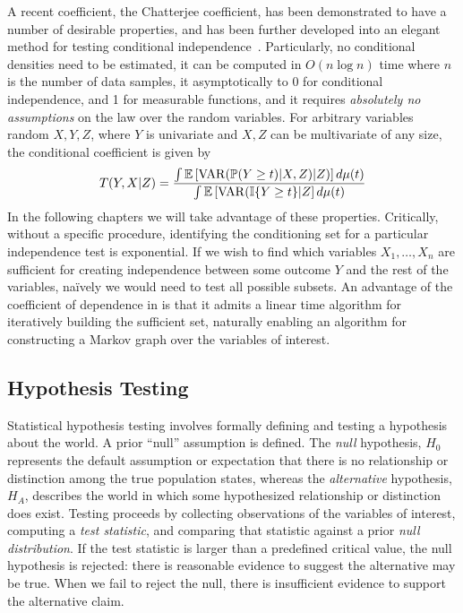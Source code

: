 A recent coefficient, the Chatterjee coefficient, has been demonstrated to have a number of desirable properties, and has been further developed into an elegant method for testing conditional independence~\citep{chatterjee2020new,codec}. 
Particularly,
no conditional densities need to be estimated,
it can be computed in $O(n\log n)$ time where $n$ is the number of data samples,
it asymptotically to 0 for conditional independence, and 1 for measurable functions,
and it requires \textit{absolutely no assumptions} on the law over the random variables.
For arbitrary variables random $X,Y,Z$, where $Y$ is univariate and $X,Z$ can be multivariate of any size, the conditional coefficient is given  by
\begin{align}\label{eq:contcodec}
    T(Y,X|Z) = \frac{\int\mathbb{E}\left[\operatorname*{VAR}(\mathbb{P}(Y\geq t)|X,Z)|Z)\right]d\mu(t)}{\int\mathbb{E}\left[\operatorname*{VAR}(\mathbb{I}\{Y\geq t\}|Z\right] d\mu(t)}
\end{align}
In the following chapters we will take advantage of these properties. Critically, without a specific procedure, identifying the conditioning set for a particular independence test is exponential. If we wish to find which variables $X_1,\ldots,X_n$ are sufficient for creating independence between some outcome $Y$ and the rest of the variables, na\"ively we would need to test all possible subsets.
An advantage of the coefficient of dependence in \cite{codec} is that it admits a linear time algorithm for iteratively building the sufficient set, naturally enabling an algorithm for constructing a Markov graph over the variables of interest.

\subsection{Hypothesis Testing}

Statistical hypothesis testing involves formally defining and testing a hypothesis about the world.
A prior ``null'' assumption is defined. The \textit{null} hypothesis, $H_0$
represents the default assumption or expectation
that there is no relationship or distinction among
the true population states,
whereas the \textit{alternative} hypothesis, $H_A$,
describes the world in which some hypothesized 
relationship or distinction does exist.
Testing proceeds by collecting observations
of the variables of interest,
computing a \textit{test statistic},
and comparing that statistic against
a prior \textit{null distribution}.
If the test statistic is larger
than a predefined critical value,
the null hypothesis is rejected:
there is reasonable evidence to suggest
the alternative may be true.
When we fail to reject the null,
there is insufficient evidence to support
the alternative claim.

